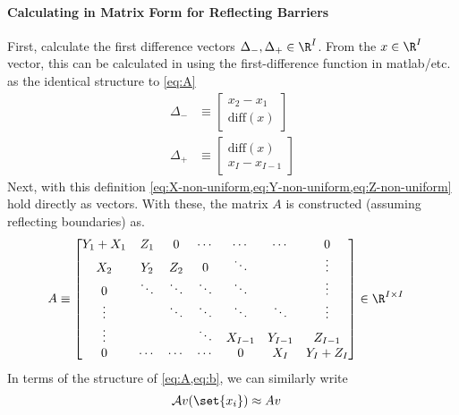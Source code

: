 \documentclass[11pt]{etk-article}
\begin{document}
\paragraph{Calculating in Matrix Form for Reflecting Barriers}
First, calculate the first difference vectors $\Delta_{-}, \Delta_{+} \in \R^I$.  From the $x \in \R^I$ vector, this can be calculated in using the first-difference function in matlab/etc. as the identical structure to \cref{eq:A}
\begin{align}
\Delta_{-} &\equiv \begin{bmatrix} x_2 - x_1 \\
\text{diff}(x)
\end{bmatrix}\\
\Delta_{+} &\equiv \begin{bmatrix} \text{diff}(x)\\
x_I - x_{I-1}
\end{bmatrix}
\end{align}
Next, with this definition \cref{eq:X-non-uniform,eq:Y-non-uniform,eq:Z-non-uniform} hold directly as vectors.  With these, the matrix $A$ is constructed (assuming reflecting boundaries) as.
\begin{align}
A &\equiv \begin{bmatrix}
Y_1 + X_1 & Z_1 & 0 & \cdots & \cdots & \cdots & 0 \\
X_2 & Y_2 & Z_2 & 0 & \ddots& & \vdots \\
0 & \ddots & \ddots & \ddots & \ddots &  & \vdots \\
\vdots & &\ddots & \ddots & \ddots & \ddots  & \vdots \\
\vdots & & & \ddots & X_{I-1} & Y_{I-1}  & Z_{I-1} \\
0 & \cdots & \cdots & \cdots & 0 & X_I & Y_I+Z_I\\
\end{bmatrix}\in\R^{I\times I}\label{eq:A-non-uniform}
\end{align}
In terms of the structure of \cref{eq:A,eq:b}, we can similarly write
\begin{align}
\mathcal{A}v(\set{x_i}) &\approx  A v
\end{align}
\end{document}
